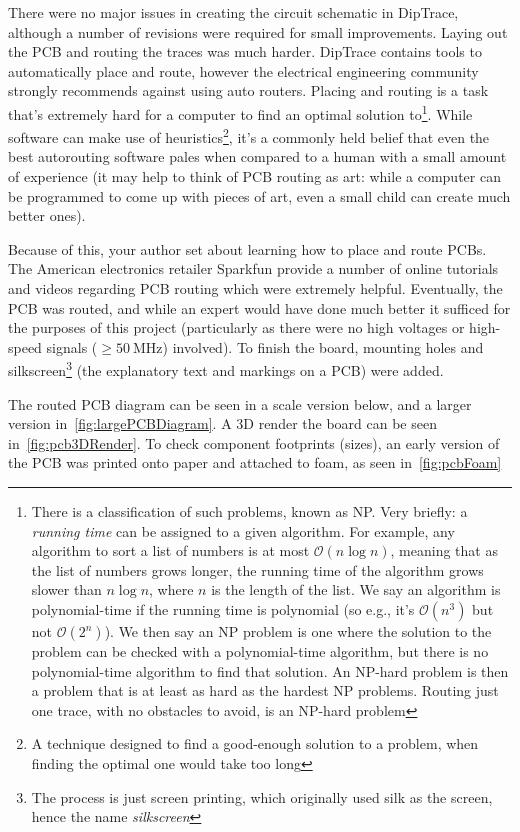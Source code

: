 There were no major issues in creating the circuit schematic in DipTrace,
although a number of revisions were required for small improvements. Laying out
the PCB and routing the traces was much harder. DipTrace contains tools to
automatically place and route, however the electrical engineering community
strongly recommends against using auto routers. Placing and routing is a task
that's extremely hard for a computer to find an optimal solution
to\footnote{There is a classification of such problems, known as NP. Very
  briefly: a \textit{running time} can be assigned to a given algorithm. For
  example, any algorithm to sort a list of numbers is at most
  $\mathcal{O}\left(n\log{n}\right)$, meaning that as the list of numbers grows
  longer, the running time of the algorithm grows slower than $n\log{n}$, where
  $n$ is the length of the list. We say an algorithm is polynomial-time if the
  running time is polynomial (so e.g., it's $\mathcal{O}\left(n^3\right)$ but
  not $\mathcal{O}\left(2^n\right)$). We then say an NP problem is one where the
  solution to the problem can be checked with a polynomial-time algorithm, but
  there is no polynomial-time algorithm to find that solution. An NP-hard
problem is then a problem that is at least as hard as the hardest NP problems.
Routing just one trace, with no obstacles to avoid, is an NP-hard problem}.
While software can make use of heuristics\footnote{A technique designed to find
a good-enough solution to a problem, when finding the optimal one would take too
long}, it's a commonly held belief that even the best autorouting software pales
when compared to a human with a small amount of experience (it may help to think
of PCB routing as art: while a computer can be programmed to come up with pieces
of art, even a small child can create much better ones).

Because of this, your author set about learning how to place and route PCBs. The
American electronics retailer Sparkfun provide a number of online tutorials and
videos regarding PCB routing which were extremely helpful. Eventually, the PCB
was routed, and while an expert would have done much better it sufficed for the
purposes of this project (particularly as there were no high voltages or
high-speed signals ($\ge\SI{50}{\MHz}$) involved). To finish the board, mounting
holes and silkscreen\footnote{The process is just screen printing, which
originally used silk as the screen, hence the name \textit{silkscreen}} (the
explanatory text and markings on a PCB) were added.

The routed PCB diagram can be seen in a scale version below, and a larger
version in~\cref{fig:largePCBDiagram}. A 3D render the board can be seen
in~\cref{fig:pcb3DRender}. To check component footprints (sizes), an early
version of the PCB was printed onto paper and attached to foam, as seen
in~\cref{fig:pcbFoam}

